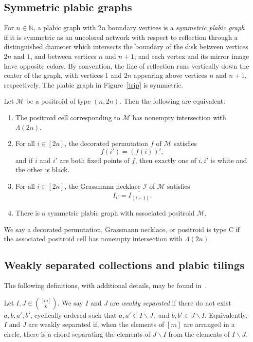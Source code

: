\documentclass[ALCO,ThmDefs,Unicode,epreuves]{cedram}
\newcommand{\Lm}{\Lambda}
\begin{document}
\subsection{Symmetric plabic graphs}

For $n \in \mathbb{N}$, a plabic graph with $2n$ boundary vertices is a \emph{symmetric plabic graph} 
if it is symmetric as an uncolored network with respect to reflection through a distinguished diameter which intersects the boundary of the disk between vertices $2n$ and $1$, and between vertices $n$ and $n+1$; and each vertex and its mirror image have opposite colors. By convention, the line of reflection runs vertically down the center of the graph, with vertices $1$ and $2n$ appearing above vertices $n$ and $n+1$, respectively. The plabic graph in Figure~\ref{trip} is symmetric. 

\begin{theo}[\cite{KS18}]
Let $\mathcal{M}$ be a positroid of type $(n, 2n)$. Then the following are equivalent:
\begin{enumerate}
\item The positroid cell corresponding to $\mathcal{M}$ has nonempty intersection with $\Lm(2n)$.
\item For all $i \in [2n]$, the decorated permutation $f$ of $\mathcal{M}$ satisfies 
\[f(i') = (f(i))',\]
and if $i$ and $i'$ are both fixed points of $f$, then exactly one of $i,i'$ is white and the other is black.
\item For all $i \in [2n]$, the Grassmann necklace $\mathcal{I}$ of $\mathcal{M}$ satisfies 
\[I_{i'} = \overline{I_{(i + 1)}}.\]
\item There is a symmetric plabic graph with associated positroid $\mathcal{M}.$
\end{enumerate}
\end{theo}

\begin{defi} We say a decorated permutation, Grassmann necklace, or positroid is type C if the associated positroid cell has nonempty intersection with $\Lm(2n)$.
\end{defi}
 
\subsection{Weakly separated collections and plabic tilings}

The following definitions, with additional details, may be found in~\cite{OPS15}.

\begin{defi}
Let $I, J \in \binom{[m]}{k}$.
We say $I$ and $J$ are \emph{weakly separated} if there do not exist $a,b,a',b'$, cyclically ordered such that $a,a' \in I \backslash J,$ and $b, b' \in J \backslash I$. Equivalently, $I$ and $J$ are weakly separated if, when the elements of $[m]$ are arranged in a circle, there is a chord separating the elements of $J \backslash I$ from the elements of $I \backslash J$.
\end{defi}
\end{document}
